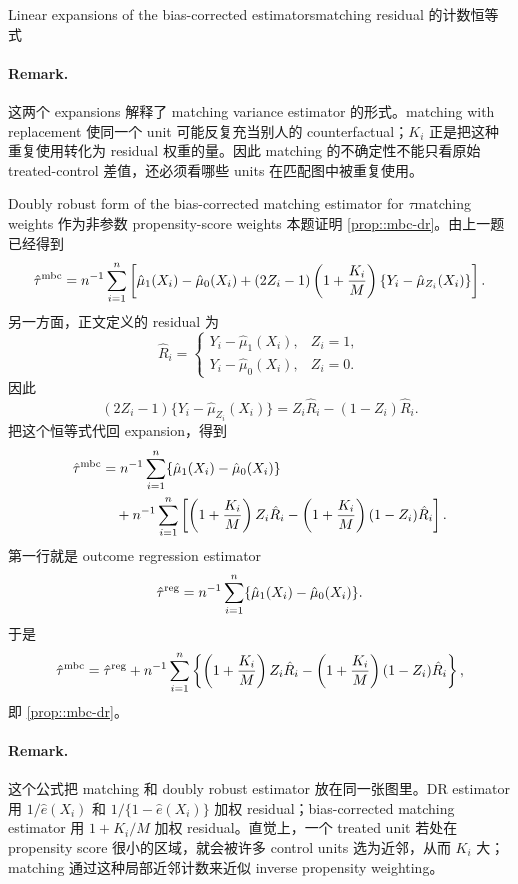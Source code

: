 \begin{exercisesolution}{Linear expansions of the bias-corrected estimators}{matching residual 的计数恒等式}
\paragraph{Remark.}
这两个 expansions 解释了 matching variance estimator 的形式。matching with replacement 使同一个 unit 可能反复充当别人的 counterfactual；$K_i$ 正是把这种重复使用转化为 residual 权重的量。因此 matching 的不确定性不能只看原始 treated-control 差值，还必须看哪些 units 在匹配图中被重复使用。
\end{exercisesolution}

\begin{exercisesolution}{Doubly robust form of the bias-corrected matching estimator for $\tau$}{matching weights 作为非参数 propensity-score weights}
本题证明 \cref{prop::mbc-dr}。由上一题已经得到
\[
\hat\tau^{\textup{mbc}}
=n^{-1}\sum_{i=1}^n\left[
\hat\mu_1(X_i)-\hat\mu_0(X_i)
 +(2Z_i-1)\left(1+{K_i\over M}\right)
 \{Y_i-\hat\mu_{Z_i}(X_i)\}
\right].
\]
另一方面，正文定义的 residual 为
\[
\hat R_i=
\begin{cases}
Y_i-\hat\mu_1(X_i), & Z_i=1,\\
Y_i-\hat\mu_0(X_i), & Z_i=0.
\end{cases}
\]
因此
\[
(2Z_i-1)\{Y_i-\hat\mu_{Z_i}(X_i)\}
=Z_i\hat R_i-(1-Z_i)\hat R_i.
\]
把这个恒等式代回 expansion，得到
\begin{align*}
\hat\tau^{\textup{mbc}}
&=n^{-1}\sum_{i=1}^n\{\hat\mu_1(X_i)-\hat\mu_0(X_i)\} \\
&\quad
 +n^{-1}\sum_{i=1}^n
\left[
\left(1+{K_i\over M}\right)Z_i\hat R_i
-\left(1+{K_i\over M}\right)(1-Z_i)\hat R_i
\right].
\end{align*}
第一行就是 outcome regression estimator
\[
\hat\tau^{\textup{reg}}
=n^{-1}\sum_{i=1}^n\{\hat\mu_1(X_i)-\hat\mu_0(X_i)\}.
\]
于是
\[
\hat{\tau}^{\textup{mbc}}
=\hat{\tau}^{\textup{reg}}
+n^{-1}\sum_{i=1}^n
\left\{
\left(1+{K_i\over M}\right)Z_i\hat R_i
-\left(1+{K_i\over M}\right)(1-Z_i)\hat R_i
\right\},
\]
即 \cref{prop::mbc-dr}。

\paragraph{Remark.}
这个公式把 matching 和 doubly robust estimator 放在同一张图里。DR estimator 用 $1/\hat e(X_i)$ 和 $1/\{1-\hat e(X_i)\}$ 加权 residual；bias-corrected matching estimator 用 $1+K_i/M$ 加权 residual。直觉上，一个 treated unit 若处在 propensity score 很小的区域，就会被许多 control units 选为近邻，从而 $K_i$ 大；matching 通过这种局部近邻计数来近似 inverse propensity weighting。
\end{exercisesolution}

